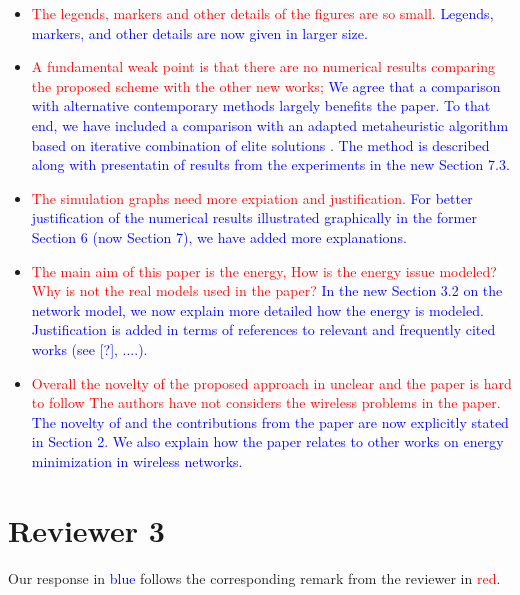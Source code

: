 \documentclass[12pt]{article}
\begin{document}
\begin{itemize}
{Done.
}
\item \textcolor{red}{The legends, markers and other details of the figures are so small.} \textcolor{blue}{
Legends, markers, and other details are now given in larger size.
}
\item \textcolor{red}{A fundamental weak point is that there are no numerical results comparing the proposed scheme with the other new works;} \textcolor{blue}{
We agree that a comparison with alternative contemporary methods largely benefits the paper.
To that end, we have included a comparison with an adapted metaheuristic algorithm based on iterative combination of elite solutions \cite{pajor18}.
The method is described along with presentatin of results from the experiments in the new Section 7.3.
}
\item \textcolor{red}{The simulation graphs need more expiation and justification.} \textcolor{blue}{
For better justification of the numerical results illustrated graphically in the former Section 6 (now Section 7),
we have added more explanations.
}
\item \textcolor{red}{ The main aim of this paper is the energy, How is the energy issue modeled? Why is not the real models used in the paper?} \textcolor{blue}{
In the new Section 3.2 on the network model, we now explain more detailed how the energy is modeled.
Justification is added in terms of references to relevant and frequently cited works (see [?], ....).
}
\item \textcolor{red}{Overall the novelty of the proposed approach in unclear and the paper is hard to follow
The authors have not considers the wireless problems in the paper.} \textcolor{blue}{
The novelty of and the contributions from the paper are now explicitly stated in Section 2.
We also explain how the paper relates to other works on energy minimization in wireless networks.
}
\end{itemize}

\section*{Reviewer 3}
Our response in \textcolor{blue}{blue} follows the corresponding remark from the reviewer in \textcolor{red}{red}.
\end{document}
